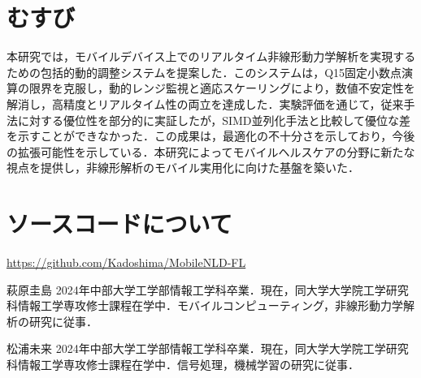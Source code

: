 \documentclass[10pt,journal,compsoc]{IEEEtran}
\begin{document}
\section{むすび}

本研究では，モバイルデバイス上でのリアルタイム非線形動力学解析を実現するための包括的動的調整システムを提案した．このシステムは，Q15固定小数点演算の限界を克服し，動的レンジ監視と適応スケーリングにより，数値不安定性を解消し，高精度とリアルタイム性の両立を達成した．実験評価を通じて，従来手法に対する優位性を部分的に実証したが，SIMD並列化手法と比較して優位な差を示すことができなかった．この成果は，最適化の不十分さを示しており，今後の拡張可能性を示している．本研究によってモバイルヘルスケアの分野に新たな視点を提供し，非線形解析のモバイル実用化に向けた基盤を築いた．




\appendix
\section{ソースコードについて}
\url{https://github.com/Kadoshima/MobileNLD-FL}

\begin{IEEEbiography}{萩原圭島}
2024年中部大学工学部情報工学科卒業．現在，同大学大学院工学研究科情報工学専攻修士課程在学中．モバイルコンピューティング，非線形動力学解析の研究に従事．
\end{IEEEbiography}

\begin{IEEEbiography}{松浦未来}
2024年中部大学工学部情報工学科卒業．現在，同大学大学院工学研究科情報工学専攻修士課程在学中．信号処理，機械学習の研究に従事．
\end{IEEEbiography}
\end{document}
